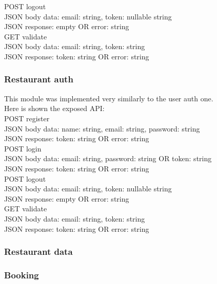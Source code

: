 POST logout\\
JSON body data: email: string, token: nullable string\\
JSON response: empty OR error: string\\

GET validate\\
JSON body data: email: string, token: string\\
JSON response: token: string OR error: string\\


\subsubsection{Restaurant auth}

This module was implemented very similarly to the user auth one.\\

Here is shown the exposed API:\\



POST register\\
JSON body data: name: string, email: string, password: string\\
JSON response: token: string OR error: string\\

POST login\\
JSON body data: email: string, password: string OR token: string\\
JSON response: token: string OR error: string\\

POST logout\\
JSON body data: email: string, token: nullable string\\
JSON response: empty OR error: string\\

GET validate\\
JSON body data: email: string, token: string\\
JSON response: token: string OR error: string\\



\subsubsection{Restaurant data}


\subsubsection{Booking}

